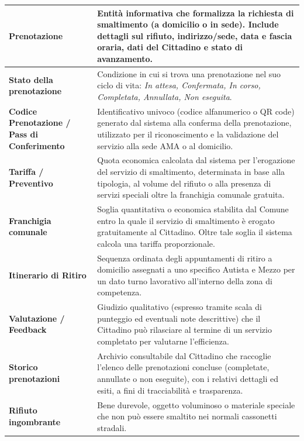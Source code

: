 \begin{center}
\begin{longtable}{|p{4.2cm}|p{10.5cm}|}
\textbf{Prenotazione} & Entità informativa che formalizza la richiesta di smaltimento (a domicilio o in sede). Include dettagli sul rifiuto, indirizzo/sede, data e fascia oraria, dati del Cittadino e stato di avanzamento. \\ \hline

\textbf{Stato della prenotazione} & Condizione in cui si trova una prenotazione nel suo ciclo di vita: \textit{In attesa, Confermata, In corso, Completata, Annullata, Non eseguita}. \\ \hline

\textbf{Codice Prenotazione / Pass di Conferimento} & Identificativo univoco (codice alfanumerico o QR code) generato dal sistema alla conferma della prenotazione, utilizzato per il riconoscimento e la validazione del servizio alla sede AMA o al domicilio. \\ \hline

\textbf{Tariffa / Preventivo} & Quota economica calcolata dal sistema per l'erogazione del servizio di smaltimento, determinata in base alla tipologia, al volume del rifiuto o alla presenza di servizi speciali oltre la franchigia comunale gratuita. \\ \hline

\textbf{Franchigia comunale} & Soglia quantitativa o economica stabilita dal Comune entro la quale il servizio di smaltimento è erogato gratuitamente al Cittadino. Oltre tale soglia il sistema calcola una tariffa proporzionale. \\ \hline

\textbf{Itinerario di Ritiro} & Sequenza ordinata degli appuntamenti di ritiro a domicilio assegnati a uno specifico Autista e Mezzo per un dato turno lavorativo all'interno della zona di competenza. \\ \hline

\textbf{Valutazione / Feedback} & Giudizio qualitativo (espresso tramite scala di punteggio ed eventuali note descrittive) che il Cittadino può rilasciare al termine di un servizio completato per valutarne l'efficienza. \\ \hline

\textbf{Storico prenotazioni} & Archivio consultabile dal Cittadino che raccoglie l'elenco delle prenotazioni concluse (completate, annullate o non eseguite), con i relativi dettagli ed esiti, a fini di tracciabilità e trasparenza. \\ \hline

\textbf{Rifiuto ingombrante} & Bene durevole, oggetto voluminoso o materiale speciale che non può essere smaltito nei normali cassonetti stradali. \\ \hline


\end{longtable}
\end{center}
